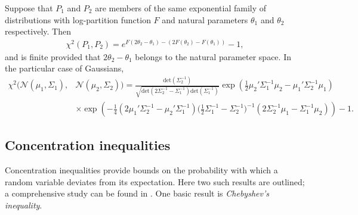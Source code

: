 \begin{lemma}\label{lemma:chi-squared-closed-form}
Suppose that $P_1$ and $P_2$ are members of the same exponential family of distributions with log-partition function $F$ and natural parameters $\theta_1$ and $\theta_2$ respectively. Then
\begin{align*}
\chi^2(P_1, P_2) = e^{F(2\theta_2 - \theta_1) - \left(2F(\theta_2) - F(\theta_1) \right) } - 1,
\end{align*}
and is finite provided that $2\theta_2 - \theta_1$ belongs to the natural parameter space.
In the particular case of Gaussians,
\begin{align*}
\chi^2\bigl( \mathcal{N}(\mu_1, \Sigma_1), 
&\mathcal{N}(\mu_2, \Sigma_2)\bigr)
=
\frac{\mathrm{det}(\Sigma_2^{-1})}{\sqrt{\mathrm{det}(2\Sigma_2^{-1} - \Sigma_1^{-1})\mathrm{det}(\Sigma_1^{-1})}}
\exp\left(
\frac12\mu_2'\Sigma_1^{-1}\mu_2 
-\mu_1'\Sigma_2^{-1}\mu_1 
\right)\\
&\times\exp\left(
-\frac14(2\mu_1' \Sigma_2^{-1} - \mu_2' \Sigma_1^{-1})
\bigl(\frac12 \Sigma_1^{-1} - \Sigma_2^{-1}\bigr)^{-1}
(2\Sigma_2^{-1}\mu_1 - \Sigma_1^{-1}\mu_2)
\right) - 1.
\end{align*}
\end{lemma}


\subsection{Concentration inequalities}

Concentration inequalities provide bounds on the probability with which a random variable deviates from its expectation.
Here two such results are outlined; a comprehensive study can be found in \cite{boucheron2013concentration}. 
One basic result is \emph{Chebyshev's inequality}.

